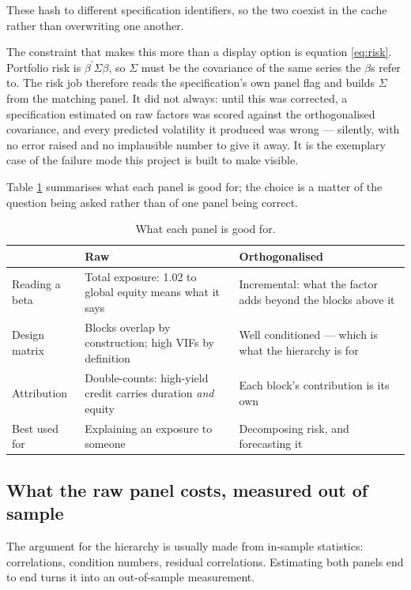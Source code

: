 \documentclass[11pt,a4paper]{article}
\begin{document}
These hash to different specification identifiers, so the two coexist in the cache
rather than overwriting one another.

The constraint that makes this more than a display option is equation
\eqref{eq:risk}. Portfolio risk is $\beta^{\prime}\Sigma\beta$, so $\Sigma$ must be
the covariance of the same series the $\beta$s refer to. The risk job therefore reads
the specification's own panel flag and builds $\Sigma$ from the matching panel. It
did not always: until this was corrected, a specification estimated on raw factors was
scored against the orthogonalised covariance, and every predicted volatility it
produced was wrong --- silently, with no error raised and no implausible number to
give it away. It is the exemplary case of the failure mode this project is built to
make visible.

Table \ref{tab:panels} summarises what each panel is good for; the choice is a
matter of the question being asked rather than of one panel being correct.

\begin{table}[htbp]
\centering
\caption{What each panel is good for.}
\label{tab:panels}
\small
\begin{tabularx}{\textwidth}{@{}lXX@{}}
\toprule
 & \textbf{Raw} & \textbf{Orthogonalised} \\
\midrule
Reading a beta & Total exposure: 1.02 to global equity means what it says & Incremental: what the factor adds beyond the blocks above it \\
Design matrix & Blocks overlap by construction; high VIFs by definition & Well conditioned --- which is what the hierarchy is for \\
Attribution & Double-counts: high-yield credit carries duration \emph{and} equity & Each block's contribution is its own \\
Best used for & Explaining an exposure to someone & Decomposing risk, and forecasting it \\
\bottomrule
\end{tabularx}
\end{table}

\subsection{What the raw panel costs, measured out of sample}

The argument for the hierarchy is usually made from in-sample statistics:
correlations, condition numbers, residual correlations. Estimating both panels end to
end turns it into an out-of-sample measurement.
\end{document}
